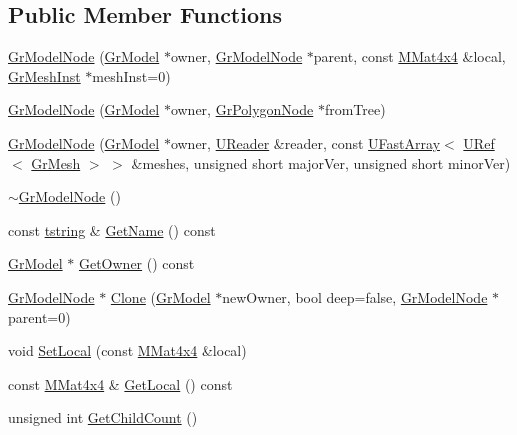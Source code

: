 \subsection*{Public Member Functions}
\begin{CompactItemize}
\item 
\hyperlink{class_gr_model_node_30cd7578448ddbb5b07276de2d96cfed}{GrModelNode} (\hyperlink{class_gr_model}{GrModel} $\ast$owner, \hyperlink{class_gr_model_node}{GrModelNode} $\ast$parent, const \hyperlink{class_m_mat4x4}{MMat4x4} \&local, \hyperlink{class_gr_mesh_inst}{GrMeshInst} $\ast$meshInst=0)
\item 
\hyperlink{class_gr_model_node_b63d4ab8c48384da1c14bc5032fde28d}{GrModelNode} (\hyperlink{class_gr_model}{GrModel} $\ast$owner, \hyperlink{class_gr_polygon_node}{GrPolygonNode} $\ast$fromTree)
\item 
\hyperlink{class_gr_model_node_391064a9dadfae2e8e0022a1f7009602}{GrModelNode} (\hyperlink{class_gr_model}{GrModel} $\ast$owner, \hyperlink{class_u_reader}{UReader} \&reader, const \hyperlink{class_u_fast_array}{UFastArray}$<$ \hyperlink{class_u_ref}{URef}$<$ \hyperlink{class_gr_mesh}{GrMesh} $>$ $>$ \&meshes, unsigned short majorVer, unsigned short minorVer)
\item 
\hyperlink{class_gr_model_node_2dfd62bcdf39b2c3004c762d865ffb0d}{$\sim$GrModelNode} ()
\item 
const \hyperlink{common__afx_8h_816fa58fd77499b0edb2c69ebe803d5c}{tstring} \& \hyperlink{class_gr_model_node_7cf09b5e2cf96cf2d1d797c2f569ea01}{GetName} () const 
\item 
\hyperlink{class_gr_model}{GrModel} $\ast$ \hyperlink{class_gr_model_node_f03b5dd5229d1c4f8f6232fd6d419335}{GetOwner} () const 
\item 
\hyperlink{class_gr_model_node}{GrModelNode} $\ast$ \hyperlink{class_gr_model_node_6bcd4b9a2763671b7bd20a5556aa1a22}{Clone} (\hyperlink{class_gr_model}{GrModel} $\ast$newOwner, bool deep=false, \hyperlink{class_gr_model_node}{GrModelNode} $\ast$parent=0)
\item 
void \hyperlink{class_gr_model_node_1de0741bd0fbf78cb7ef6802948b6080}{SetLocal} (const \hyperlink{class_m_mat4x4}{MMat4x4} \&local)
\item 
const \hyperlink{class_m_mat4x4}{MMat4x4} \& \hyperlink{class_gr_model_node_830a21b1037e3b0d6859626bc5bfcf74}{GetLocal} () const 
\item 
unsigned int \hyperlink{class_gr_model_node_a21248145ac1e276678ee4e8e1b02b0c}{GetChildCount} ()
\item 

\end{CompactItemize}
